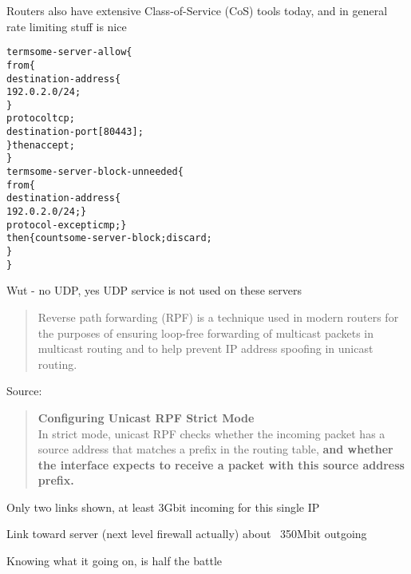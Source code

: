 \documentclass[Screen16to9,17pt]{foils}
\begin{document}
Routers also have extensive Class-of-Service (CoS) tools today, and in general rate limiting stuff is nice


\begin{alltt}\footnotesize
term some-server-allow \{
    from \{
        destination-address \{
            192.0.2.0/24;
        \}
        protocol tcp;
        destination-port [ 80 443 ];
    \} then accept;
\}
term some-server-block-unneeded \{
    from \{
        destination-address \{
            192.0.2.0/24; \}
        protocol-except icmp;  \}
    then \{ count some-server-block; discard;
    \}
\}
\end{alltt}

Wut - no UDP, yes UDP service is not used on these servers




\begin{quote}
Reverse path forwarding (RPF) is a technique used in modern routers for the purposes of ensuring loop-free forwarding of multicast packets in multicast routing and to help prevent IP address spoofing in unicast routing.
\end{quote}
Source: 

\begin{quote}
{\bf Configuring Unicast RPF Strict Mode}\\
In strict mode, unicast RPF checks whether the incoming packet has a source address that matches a prefix in the routing table, {\bf and whether the interface expects to receive a packet with this source address prefix.}
\end{quote}









\centerline{Only two links shown, at least 3Gbit incoming for this single IP}


\begin{list1}
\item Link toward server (next level firewall actually) about ~350Mbit outgoing
\item Knowing what it going on, is half the battle
\end{list1}
\end{document}
